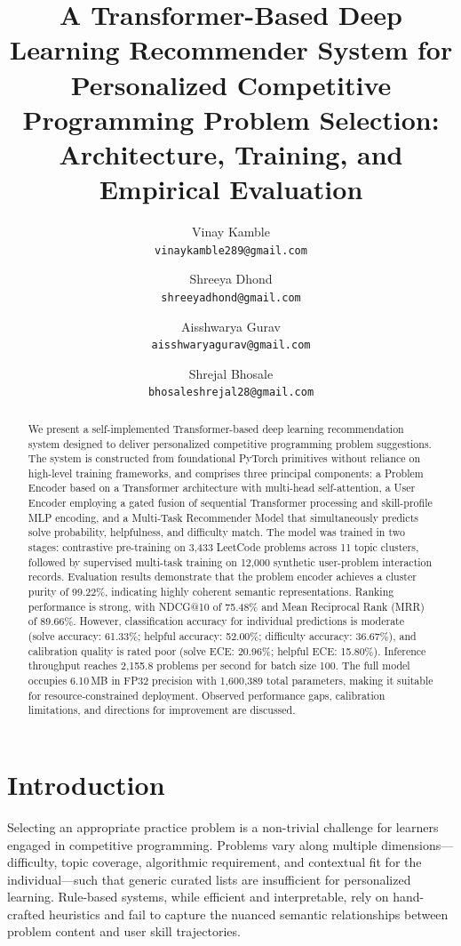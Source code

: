\documentclass[12pt]{article}
\title{\textbf{A Transformer-Based Deep Learning Recommender System for Personalized Competitive Programming Problem Selection: Architecture, Training, and Empirical Evaluation}}
\author{
Vinay Kamble\\
\texttt{vinaykamble289@gmail.com}
\and
Shreeya Dhond\\
\texttt{shreeyadhond@gmail.com}
\and
Aisshwarya Gurav\\
\texttt{aisshwaryagurav@gmail.com}
\and
Shrejal Bhosale\\
\texttt{bhosaleshrejal28@gmail.com}
}
\begin{document}
\maketitle

\tableofcontents
\listoffigures
\listoftables

\newpage

\begin{abstract}
We present a self-implemented Transformer-based deep learning recommendation system designed to deliver personalized competitive programming problem suggestions. The system is constructed from foundational PyTorch primitives without reliance on high-level training frameworks, and comprises three principal components: a Problem Encoder based on a Transformer architecture with multi-head self-attention, a User Encoder employing a gated fusion of sequential Transformer processing and skill-profile MLP encoding, and a Multi-Task Recommender Model that simultaneously predicts solve probability, helpfulness, and difficulty match. The model was trained in two stages: contrastive pre-training on 3,433 LeetCode problems across 11 topic clusters, followed by supervised multi-task training on 12,000 synthetic user-problem interaction records. Evaluation results demonstrate that the problem encoder achieves a cluster purity of 99.22\%, indicating highly coherent semantic representations. Ranking performance is strong, with NDCG@10 of 75.48\% and Mean Reciprocal Rank (MRR) of 89.66\%. However, classification accuracy for individual predictions is moderate (solve accuracy: 61.33\%; helpful accuracy: 52.00\%; difficulty accuracy: 36.67\%), and calibration quality is rated poor (solve ECE: 20.96\%; helpful ECE: 15.80\%). Inference throughput reaches 2,155.8 problems per second for batch size 100. The full model occupies 6.10\,MB in FP32 precision with 1,600,389 total parameters, making it suitable for resource-constrained deployment. Observed performance gaps, calibration limitations, and directions for improvement are discussed.
\end{abstract}

\newpage

\section{Introduction}

Selecting an appropriate practice problem is a non-trivial challenge for learners engaged in competitive programming. Problems vary along multiple dimensions---difficulty, topic coverage, algorithmic requirement, and contextual fit for the individual---such that generic curated lists are insufficient for personalized learning. Rule-based systems, while efficient and interpretable, rely on hand-crafted heuristics and fail to capture the nuanced semantic relationships between problem content and user skill trajectories.
\end{document}
